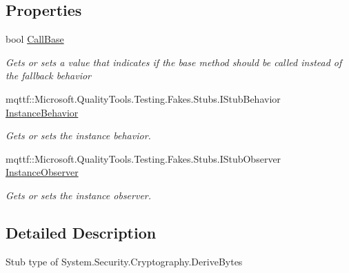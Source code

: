 \subsection*{Properties}
\begin{DoxyCompactItemize}
\item 
bool \hyperlink{class_system_1_1_security_1_1_cryptography_1_1_fakes_1_1_stub_derive_bytes_a6a660bc17163cd604142d5168f3a208c}{Call\-Base}
\begin{DoxyCompactList}\small\item\em Gets or sets a value that indicates if the base method should be called instead of the fallback behavior\end{DoxyCompactList}\item 
mqttf\-::\-Microsoft.\-Quality\-Tools.\-Testing.\-Fakes.\-Stubs.\-I\-Stub\-Behavior \hyperlink{class_system_1_1_security_1_1_cryptography_1_1_fakes_1_1_stub_derive_bytes_a1fd55d9509ebad55e06fa9ea38743027}{Instance\-Behavior}
\begin{DoxyCompactList}\small\item\em Gets or sets the instance behavior.\end{DoxyCompactList}\item 
mqttf\-::\-Microsoft.\-Quality\-Tools.\-Testing.\-Fakes.\-Stubs.\-I\-Stub\-Observer \hyperlink{class_system_1_1_security_1_1_cryptography_1_1_fakes_1_1_stub_derive_bytes_aca28c55d2e572bf87961337e9eba6856}{Instance\-Observer}
\begin{DoxyCompactList}\small\item\em Gets or sets the instance observer.\end{DoxyCompactList}\end{DoxyCompactItemize}


\subsection{Detailed Description}
Stub type of System.\-Security.\-Cryptography.\-Derive\-Bytes



